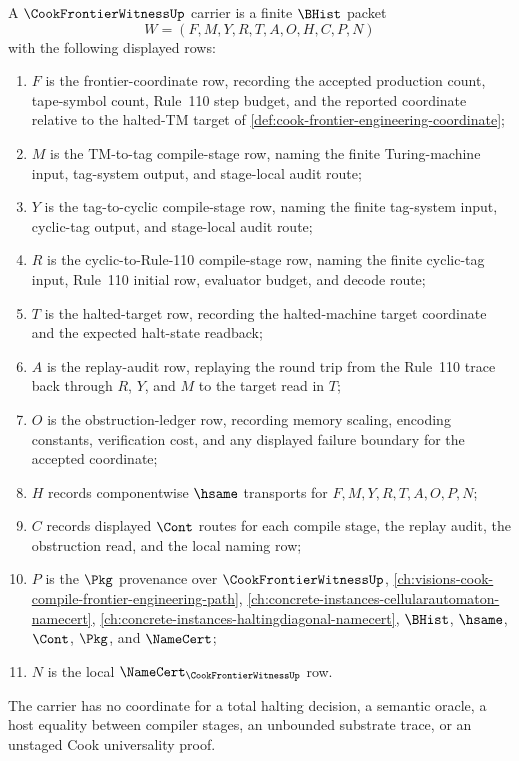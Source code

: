 \begin{definition}
\label{def:cook-frontier-witness-carrier}
A $\CookFrontierWitnessUp$ carrier is a finite $\BHist$ packet
$$
W=(F,M,Y,R,T,A,O,H,C,P,N)
$$
with the following displayed rows:
\begin{enumerate}
\item $F$ is the frontier-coordinate row, recording the accepted production count, tape-symbol count, Rule~110 step budget, and the reported coordinate relative to the halted-TM target of \autoref{def:cook-frontier-engineering-coordinate};
\item $M$ is the TM-to-tag compile-stage row, naming the finite Turing-machine input, tag-system output, and stage-local audit route;
\item $Y$ is the tag-to-cyclic compile-stage row, naming the finite tag-system input, cyclic-tag output, and stage-local audit route;
\item $R$ is the cyclic-to-Rule-110 compile-stage row, naming the finite cyclic-tag input, Rule~110 initial row, evaluator budget, and decode route;
\item $T$ is the halted-target row, recording the halted-machine target coordinate and the expected halt-state readback;
\item $A$ is the replay-audit row, replaying the round trip from the Rule~110 trace back through $R$, $Y$, and $M$ to the target read in $T$;
\item $O$ is the obstruction-ledger row, recording memory scaling, encoding constants, verification cost, and any displayed failure boundary for the accepted coordinate;
\item $H$ records componentwise $\hsame$ transports for $F,M,Y,R,T,A,O,P,N$;
\item $C$ records displayed $\Cont$ routes for each compile stage, the replay audit, the obstruction read, and the local naming row;
\item $P$ is the $\Pkg$ provenance over $\CookFrontierWitnessUp$, \autoref{ch:visions-cook-compile-frontier-engineering-path}, \autoref{ch:concrete-instances-cellularautomaton-namecert}, \autoref{ch:concrete-instances-haltingdiagonal-namecert}, $\BHist$, $\hsame$, $\Cont$, $\Pkg$, and $\NameCert$;
\item $N$ is the local $\NameCert_{\CookFrontierWitnessUp}$ row.
\end{enumerate}
The carrier has no coordinate for a total halting decision, a semantic oracle, a host equality between compiler stages, an unbounded substrate trace, or an unstaged Cook universality proof.
\end{definition}

